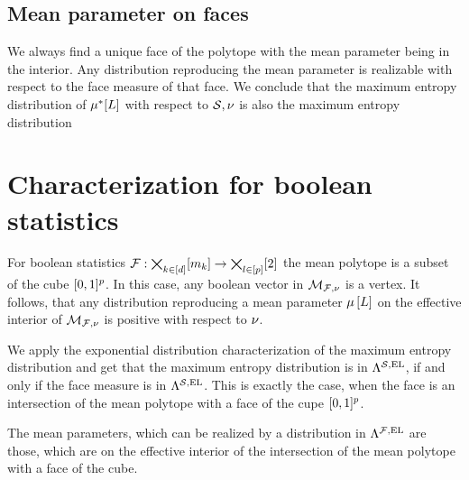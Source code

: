 \documentclass[aps,onecolumn,nofootinbib,pra]{article}
\begin{document}
    \subsection{Mean parameter on faces}

    We always find a unique face of the polytope with the mean parameter being in the interior.
    Any distribution reproducing the mean parameter is realizable with respect to the face measure of that face.
    We conclude that the maximum entropy distribution of $\mu^*[L]$ with respect to $\mathcal{S},\nu$ is also the maximum entropy distribution



    \section{Characterization for boolean statistics}

    For boolean statistics $\mathcal{F}:\bigtimes_{k\in[d]}[m_{k}]\rightarrow\bigtimes_{l\in[p]}[2]$ the mean polytope is a subset of the cube $[0,1]^p$.
    In this case, any boolean vector in $\mathcal{M}_{\mathcal{F},\nu}$ is a vertex.
    It follows, that any distribution reproducing a mean parameter $\mu\left[L\right]$ on the effective interior of $\mathcal{M}_{\mathcal{F},\nu}$ is positive with respect to $\nu$.

    We apply the exponential distribution characterization of the maximum entropy distribution and get that the maximum entropy distribution is in $\Lambda^{\mathcal{S},\mathrm{EL}}$, if and only if the face measure is in $\Lambda^{\mathcal{S},\mathrm{EL}}$.
    This is exactly the case, when the face is an intersection of the mean polytope with a face of the cupe $[0,1]^p$.

    The mean parameters, which can be realized by a distribution in $\Lambda^{\mathcal{F},\mathrm{EL}}$ are those, which are on the effective interior of the intersection of the mean polytope with a face of the cube.
\end{document}
